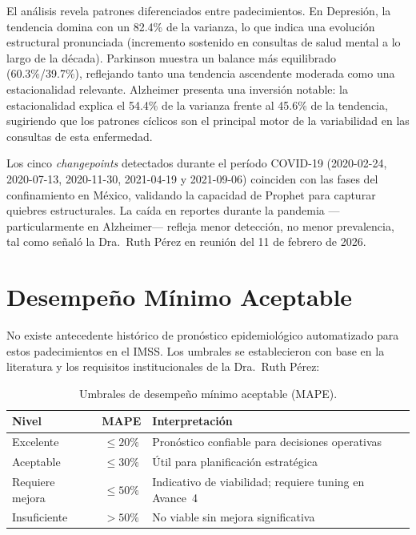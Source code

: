 \documentclass[11pt,a4paper]{article}
\begin{document}
El análisis revela patrones diferenciados entre padecimientos. En Depresión, la tendencia domina con un 82.4\% de la varianza, lo que indica una evolución estructural pronunciada (incremento sostenido en consultas de salud mental a lo largo de la década). Parkinson muestra un balance más equilibrado (60.3\%/39.7\%), reflejando tanto una tendencia ascendente moderada como una estacionalidad relevante. Alzheimer presenta una inversión notable: la estacionalidad explica el 54.4\% de la varianza frente al 45.6\% de la tendencia, sugiriendo que los patrones cíclicos son el principal motor de la variabilidad en las consultas de esta enfermedad.

Los cinco \emph{changepoints} detectados durante el período COVID-19 (2020-02-24, 2020-07-13, 2020-11-30, 2021-04-19 y 2021-09-06) coinciden con las fases del confinamiento en México, validando la capacidad de Prophet para capturar quiebres estructurales. La caída en reportes durante la pandemia —particularmente en Alzheimer— refleja menor detección, no menor prevalencia, tal como señaló la Dra.\ Ruth Pérez en reunión del 11 de febrero de 2026.

\section{Desempeño Mínimo Aceptable}\label{sec:desempeno}

No existe antecedente histórico de pronóstico epidemiológico automatizado para estos padecimientos en el IMSS. Los umbrales se establecieron con base en la literatura \citep{hyndman2021forecasting} y los requisitos institucionales de la Dra.\ Ruth Pérez:

\begin{table}[H]
\centering
\caption{Umbrales de desempeño mínimo aceptable (MAPE).}
\label{tab:umbrales}
\begin{tabular}{@{}l c l@{}}
\toprule
\textbf{Nivel} & \textbf{MAPE} & \textbf{Interpretación} \\
\midrule
Excelente & $\leq 20\%$ & Pronóstico confiable para decisiones operativas \\
Aceptable & $\leq 30\%$ & Útil para planificación estratégica \\
Requiere mejora & $\leq 50\%$ & Indicativo de viabilidad; requiere tuning en Avance~4 \\
Insuficiente & $> 50\%$ & No viable sin mejora significativa \\
\bottomrule
\end{tabular}
\end{table}
\end{document}
